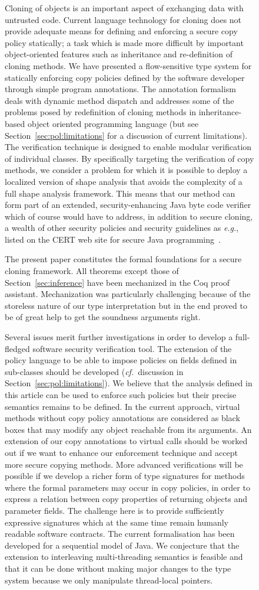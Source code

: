 \documentclass{LMCS}
\begin{document}
\begin{figure}
Cloning of objects is an important aspect of exchanging data with
untrusted code. Current language technology for cloning does not
provide adequate means for defining and enforcing a secure copy policy
statically; a task which is made more difficult by important
object-oriented features such as inheritance and re-definition of
cloning methods. We have presented a flow-sensitive type system for
statically enforcing copy policies defined by the software developer
through simple program annotations. The annotation formalism deals
with dynamic method dispatch and addresses some of the problems posed
by redefinition of cloning methods in inheritance-based object
oriented programming language (but see
Section~\ref{sec:pol:limitations} for a discussion of current
limitations). The verification technique is designed to enable modular
verification of individual classes. By specifically targeting the
verification of copy methods, we consider a problem for which it is
possible to deploy a localized version of shape analysis that avoids
the complexity of a full shape analysis framework. This means that our
method can form part of an extended, security-enhancing Java byte code
verifier which of course would have to address, in addition to secure cloning, a wealth of other
security policies and security guidelines as \emph{e.g.}, listed on
the CERT web site for secure Java
programming~\cite{CertGuidelines:2010}.

The present paper constitutes the formal foundations for a secure
cloning framework. All theorems except those of
Section~\ref{sec:inference} have been mechanized in the Coq proof
assistant. Mechanization was particularly challenging because
of the storeless nature of our type interpretation but in the end
proved to be  of great help to get the
soundness arguments right. 

 Several issues merit further investigations in order
to develop a full-fledged software security verification tool. 
The extension of the policy language to be able to impose policies on
fields defined in sub-classes should be developed
(\emph{cf.}~discussion in Section~\ref{sec:pol:limitations}). We
believe that the 
analysis defined in this article can be used to enforce such policies
but their precise semantics remains to be defined. 
In the current approach, virtual methods without copy
policy annotations are considered as black boxes that may modify any object reachable
from its arguments. An extension of our copy annotations to virtual
calls should be worked out if we want to enhance our enforcement
technique and accept more secure copying methods. More advanced verifications
will be possible if we
develop a richer form of type signatures for methods where the formal
parameters may occur in copy policies, in order to express a relation
between copy properties of returning objects and parameter fields.
The challenge here is to provide sufficiently expressive signatures
which at the same time remain humanly readable software contracts. 
The current formalisation has been developed for a sequential model of
Java. We conjecture that the extension to interleaving multi-threading
semantics is feasible and that it can be done without making major changes to the type system
because we only manipulate thread-local pointers. 



\end{figure}
\end{document}
